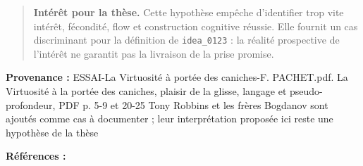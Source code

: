 \documentclass[10pt,a4paper]{article}
\begin{document}
\begin{quote}
\textbf{Intérêt pour la thèse.} Cette hypothèse empêche d'identifier trop vite intérêt, fécondité, flow et construction cognitive réussie. Elle fournit un cas discriminant pour la définition de \texttt{idea\_0123} : la réalité prospective de l'intérêt ne garantit pas la livraison de la prise promise.
\end{quote}
{\footnotesize\color{metadata}\textbf{Provenance :} ESSAI-La Virtuosité à portée des caniches-F. PACHET.pdf. La Virtuosité à la portée des caniches, plaisir de la glisse, langage et pseudo-profondeur, PDF p. 5-9 et 20-25 Tony Robbins et les frères Bogdanov sont ajoutés comme cas à documenter ; leur interprétation proposée ici reste une hypothèse de la thèse\par}
{\footnotesize\color{metadata}\textbf{Références :} \parencite{robbinsPersonalPower,baez2004bogdanoff,bogdanoff2002etat}\par}
\clearpage
\end{document}
